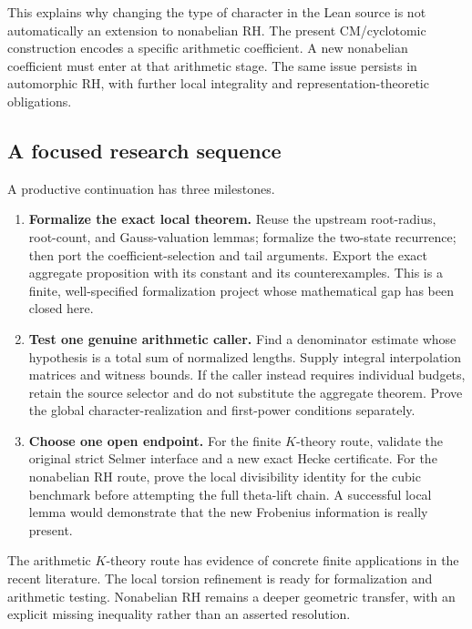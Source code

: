 This explains why changing the type of character in the Lean
source is not automatically an extension to nonabelian RH. The present
CM/cyclotomic construction encodes a specific arithmetic coefficient.
A new nonabelian coefficient must enter at that arithmetic stage.
The same issue persists in automorphic RH, with further local integrality
and representation-theoretic obligations.

\subsection{A focused research sequence}

A productive continuation has three milestones.

\begin{enumerate}[leftmargin=*,itemsep=5pt]
\item \textbf{Formalize the exact local theorem.}
Reuse the upstream root-radius, root-count, and Gauss-valuation lemmas;
formalize the two-state recurrence; then port the coefficient-selection
and tail arguments. Export the exact aggregate proposition with its
constant and its counterexamples. This is a finite, well-specified
formalization project whose mathematical gap has been closed here.
\item \textbf{Test one genuine arithmetic caller.}
Find a denominator estimate whose hypothesis is a total sum of normalized
lengths. Supply integral interpolation matrices and witness bounds.
If the caller instead requires individual budgets, retain the source
selector and do not substitute the aggregate theorem. Prove the global
character-realization and first-power conditions separately.
\item \textbf{Choose one open endpoint.}
For the finite \(K\)-theory route, validate the original strict
Selmer interface and a new exact Hecke certificate. For the nonabelian
RH route, prove the local divisibility identity for the cubic benchmark
before attempting the full theta-lift chain. A successful local lemma
would demonstrate that the new Frobenius information is really present.
\end{enumerate}

The arithmetic \(K\)-theory route has evidence of concrete finite
applications in the recent literature. The local torsion refinement is
ready for formalization and arithmetic testing. Nonabelian RH remains
a deeper geometric transfer, with an explicit missing inequality rather
than an asserted resolution.

